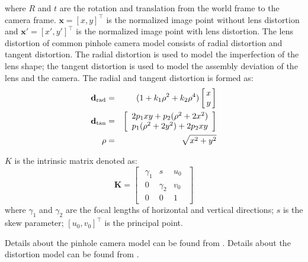 \documentclass{report}
\begin{document}
where $R$ and $t$ are the rotation and translation from the world frame to the camera frame. $\mathbf{x} = [x, y]^\top$ is the normalized image point without lens distortion and $\mathbf{x}' = [x', y']^\top$ is the normalized image point with lens distortion. The lens distortion of common pinhole camera model consists of radial distortion and tangent distortion. The radial distortion is used to model the imperfection of the lens shape; the tangent distortion is used to model the assembly deviation of the lens and the camera. The radial and tangent distortion is formed as: 
\begin{eqnarray}
\mathbf{d}_\text{rad}
&=&
(1 + k_1 \rho^2 + k_2 \rho^4) 
\arraycolsep=1.5pt%
\begin{bmatrix}
	\begin{array}{c}
	x \\ y
	\end{array}
\end{bmatrix} \\
\mathbf{d}_\text{tan} 
&=&
\begin{bmatrix}
	\begin{array}{c}
	2 p_1 x y + p_2 (\rho^2 + 2 x^2) \\ 
	p_1 (\rho^2 + 2 y^2) + 2 p_2 x y
	\end{array}
\end{bmatrix} \\
\rho &=& \sqrt{x^2 + y^2}
\end{eqnarray}

$K$ is the intrinsic matrix denoted as: 
\begin{equation}
\mathbf{K} = 
\begin{bmatrix}
	\begin{array}{ccc}
	\gamma_1 & s & u_0 \\ 
	0 & \gamma_2 & v_0 \\ 	
	0 & 0 & 1
	\end{array}
\end{bmatrix}
\label{kEqn}
\end{equation}
where $\gamma_1$ and $\gamma_2$ are the focal lengths of horizontal and vertical directions; $s$ is the skew parameter; $[u_0, v_0]^\top$ is the principal point. 

Details about the pinhole camera model can be found from \cite{hartley2000multiple}. Details about the distortion model can be found from \cite{heikkila1997four}. 
\end{document}

